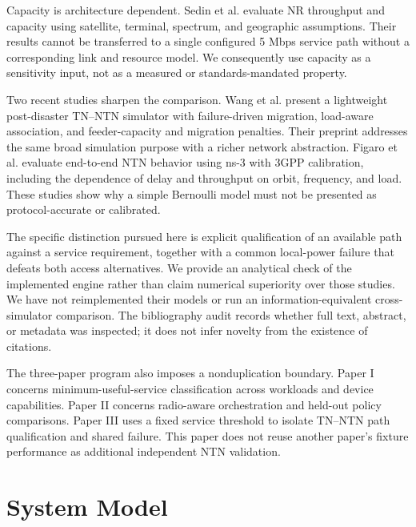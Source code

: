\documentclass[10pt,twocolumn]{article}
\begin{document}
Capacity is architecture dependent. Sedin et al. \cite{sedin2020} evaluate NR throughput and capacity using satellite, terminal, spectrum, and geographic assumptions. Their results cannot be transferred to a single configured 5 Mbps service path without a corresponding link and resource model. We consequently use capacity as a sensitivity input, not as a measured or standards-mandated property.

Two recent studies sharpen the comparison. Wang et al. \cite{wang2026} present a lightweight post-disaster TN--NTN simulator with failure-driven migration, load-aware association, and feeder-capacity and migration penalties. Their preprint addresses the same broad simulation purpose with a richer network abstraction. Figaro et al. \cite{figaro2026} evaluate end-to-end NTN behavior using ns-3 with 3GPP calibration, including the dependence of delay and throughput on orbit, frequency, and load. These studies show why a simple Bernoulli model must not be presented as protocol-accurate or calibrated.

The specific distinction pursued here is explicit qualification of an available path against a service requirement, together with a common local-power failure that defeats both access alternatives. We provide an analytical check of the implemented engine rather than claim numerical superiority over those studies. We have not reimplemented their models or run an information-equivalent cross-simulator comparison. The bibliography audit records whether full text, abstract, or metadata was inspected; it does not infer novelty from the existence of citations.

The three-paper program also imposes a nonduplication boundary. Paper I concerns minimum-useful-service classification across workloads and device capabilities. Paper II concerns radio-aware orchestration and held-out policy comparisons. Paper III uses a fixed service threshold to isolate TN--NTN path qualification and shared failure. This paper does not reuse another paper's fixture performance as additional independent NTN validation.

\section{System Model}
\end{document}

